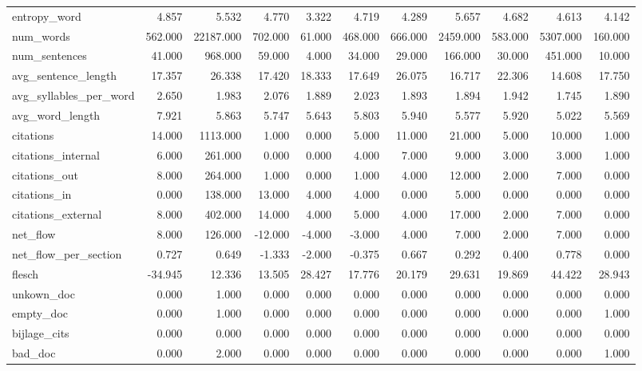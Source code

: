 \begin{tabular}{lrrrrrrrrrr}
\cline{1-11}
entropy\_word & 4.857 & 5.532 & 4.770 & 3.322 & 4.719 & 4.289 & 5.657 & 4.682 & 4.613 & 4.142 \\
\cline{1-11}
num\_words & 562.000 & 22187.000 & 702.000 & 61.000 & 468.000 & 666.000 & 2459.000 & 583.000 & 5307.000 & 160.000 \\
\cline{1-11}
num\_sentences & 41.000 & 968.000 & 59.000 & 4.000 & 34.000 & 29.000 & 166.000 & 30.000 & 451.000 & 10.000 \\
\cline{1-11}
avg\_sentence\_length & 17.357 & 26.338 & 17.420 & 18.333 & 17.649 & 26.075 & 16.717 & 22.306 & 14.608 & 17.750 \\
\cline{1-11}
avg\_syllables\_per\_word & 2.650 & 1.983 & 2.076 & 1.889 & 2.023 & 1.893 & 1.894 & 1.942 & 1.745 & 1.890 \\
\cline{1-11}
avg\_word\_length & 7.921 & 5.863 & 5.747 & 5.643 & 5.803 & 5.940 & 5.577 & 5.920 & 5.022 & 5.569 \\
\cline{1-11}
citations & 14.000 & 1113.000 & 1.000 & 0.000 & 5.000 & 11.000 & 21.000 & 5.000 & 10.000 & 1.000 \\
\cline{1-11}
citations\_internal & 6.000 & 261.000 & 0.000 & 0.000 & 4.000 & 7.000 & 9.000 & 3.000 & 3.000 & 1.000 \\
\cline{1-11}
citations\_out & 8.000 & 264.000 & 1.000 & 0.000 & 1.000 & 4.000 & 12.000 & 2.000 & 7.000 & 0.000 \\
\cline{1-11}
citations\_in & 0.000 & 138.000 & 13.000 & 4.000 & 4.000 & 0.000 & 5.000 & 0.000 & 0.000 & 0.000 \\
\cline{1-11}
citations\_external & 8.000 & 402.000 & 14.000 & 4.000 & 5.000 & 4.000 & 17.000 & 2.000 & 7.000 & 0.000 \\
\cline{1-11}
net\_flow & 8.000 & 126.000 & -12.000 & -4.000 & -3.000 & 4.000 & 7.000 & 2.000 & 7.000 & 0.000 \\
\cline{1-11}
net\_flow\_per\_section & 0.727 & 0.649 & -1.333 & -2.000 & -0.375 & 0.667 & 0.292 & 0.400 & 0.778 & 0.000 \\
\cline{1-11}
flesch & -34.945 & 12.336 & 13.505 & 28.427 & 17.776 & 20.179 & 29.631 & 19.869 & 44.422 & 28.943 \\
\cline{1-11}
unkown\_doc & 0.000 & 1.000 & 0.000 & 0.000 & 0.000 & 0.000 & 0.000 & 0.000 & 0.000 & 0.000 \\
\cline{1-11}
empty\_doc & 0.000 & 1.000 & 0.000 & 0.000 & 0.000 & 0.000 & 0.000 & 0.000 & 0.000 & 1.000 \\
\cline{1-11}
bijlage\_cits & 0.000 & 0.000 & 0.000 & 0.000 & 0.000 & 0.000 & 0.000 & 0.000 & 0.000 & 0.000 \\
\cline{1-11}
bad\_doc & 0.000 & 2.000 & 0.000 & 0.000 & 0.000 & 0.000 & 0.000 & 0.000 & 0.000 & 1.000 \\
\cline{1-11}
\bottomrule
\end{tabular}
